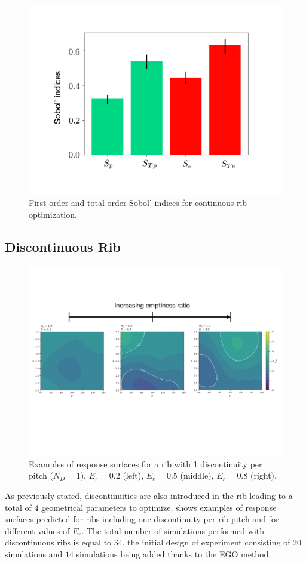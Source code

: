 \begin{figure}[h]
\centering
\includegraphics[width=0.6\linewidth,keepaspectratio]{fig/applications/optim/Sobol_continu.pdf}
\caption{First order and total order Sobol' indices for continuous rib optimization.}
\label{sensitivity2D}
\end{figure}

\subsection{Discontinuous Rib}
\label{sec:discontinuous_rib}

\begin{figure}[h!]
\centering
\includegraphics[width=\linewidth,keepaspectratio]{fig/applications/optim/GP_1ND.pdf}
\caption{Examples of response surfaces for a rib with 1 discontinuity per pitch ($N_D=1$). $E_r=0.2$ (left), $E_r=0.5$ (middle), $E_r=0.8$ (right).}
\label{1D_RS}
\end{figure}

As previously stated, discontinuities are also introduced in the rib leading to a total of 4 geometrical parameters to optimize.  shows examples of response surfaces predicted for ribs including one discontinuity per rib pitch and for different values of $E_r$. The total number of simulations performed with discontinuous ribs is equal to $34$, the initial design of experiment consisting of $20$ simulations and $14$ simulations being added thanks to the EGO method.\\

